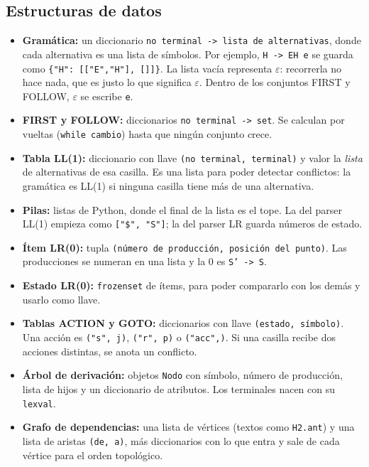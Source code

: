\documentclass[11pt,a4paper]{article}
\newcommand{\code}[1]{\texttt{#1}}
\begin{document}
\subsection*{Estructuras de datos}

\begin{itemize}
  \item \textbf{Gramática:} un diccionario \code{no terminal -> lista de alternativas}, donde cada alternativa es una lista de símbolos. Por ejemplo, \code{H -> EH e} se guarda como \code{\{"H": [["E","H"], []]\}}. La lista vacía representa $\varepsilon$: recorrerla no hace nada, que es justo lo que significa $\varepsilon$. Dentro de los conjuntos FIRST y FOLLOW, $\varepsilon$ se escribe \code{e}.
  \item \textbf{FIRST y FOLLOW:} diccionarios \code{no terminal -> set}. Se calculan por vueltas (\code{while cambio}) hasta que ningún conjunto crece.
  \item \textbf{Tabla LL(1):} diccionario con llave \code{(no terminal, terminal)} y valor la \emph{lista} de alternativas de esa casilla. Es una lista para poder detectar conflictos: la gramática es LL(1) si ninguna casilla tiene más de una alternativa.
  \item \textbf{Pilas:} listas de Python, donde el final de la lista es el tope. La del parser LL(1) empieza como \code{["\$", "S"]}; la del parser LR guarda números de estado.
  \item \textbf{Ítem LR(0):} tupla \code{(número de producción, posición del punto)}. Las producciones se numeran en una lista y la 0 es \code{S' -> S}.
  \item \textbf{Estado LR(0):} \code{frozenset} de ítems, para poder compararlo con los demás y usarlo como llave.
  \item \textbf{Tablas ACTION y GOTO:} diccionarios con llave \code{(estado, símbolo)}. Una acción es \code{("s", j)}, \code{("r", p)} o \code{("acc",)}. Si una casilla recibe dos acciones distintas, se anota un conflicto.
  \item \textbf{Árbol de derivación:} objetos \code{Nodo} con símbolo, número de producción, lista de hijos y un diccionario de atributos. Los terminales nacen con su \code{lexval}.
  \item \textbf{Grafo de dependencias:} una lista de vértices (textos como \code{H2.ant}) y una lista de aristas \code{(de, a)}, más diccionarios con lo que entra y sale de cada vértice para el orden topológico.
\end{itemize}
\end{document}
